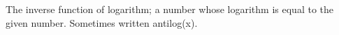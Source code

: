 The inverse function of logarithm; a number whose logarithm
is equal to the given number. Sometimes written antilog(x).